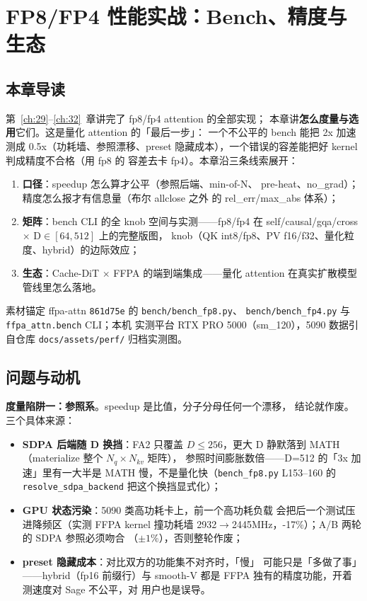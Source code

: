 \chapter{FP8/FP4 性能实战：Bench、精度与生态}\label{ch:33}

\section{本章导读}

第~\ref{ch:29}--\ref{ch:32}~章讲完了 fp8/fp4 attention 的全部实现；
本章讲\textbf{怎么度量与选用}它们。这是量化 attention 的「最后一步」：
一个不公平的 bench 能把 2x 加速测成 0.5x（功耗墙、参照漂移、preset
隐藏成本），一个错误的容差能把好 kernel 判成精度不合格（用 fp8 的
容差去卡 fp4）。本章沿三条线索展开：
\begin{enumerate}[itemsep=0pt,topsep=2pt]
  \item \textbf{口径}：speedup 怎么算才公平（参照后端、min-of-N、
        pre-heat、no\_grad）；精度怎么报才有信息量（布尔 allclose 之外
        的 rel\_err/max\_abs 体系）；
  \item \textbf{矩阵}：bench CLI 的全 knob 空间与实测——fp8/fp4 在
        self/causal/gqa/cross $\times$ D$\in[64,512]$ 上的完整版图，
        knob（QK int8/fp8、PV f16/f32、量化粒度、hybrid）的边际效应；
  \item \textbf{生态}：Cache-DiT $\times$ FFPA 的端到端集成——量化
        attention 在真实扩散模型管线里怎么落地。
\end{enumerate}
素材锚定 ffpa-attn \texttt{861d75e} 的 \texttt{bench/bench\_fp8.py}、
\texttt{bench/bench\_fp4.py} 与 \texttt{ffpa\_attn.bench} CLI；本机
实测平台 RTX PRO 5000（sm\_120），5090 数据引自仓库
\texttt{docs/assets/perf/} 归档实测图。

\section{问题与动机}

\textbf{度量陷阱一：参照系}。speedup 是比值，分子分母任何一个漂移，
结论就作废。三个具体来源：
\begin{itemize}[itemsep=0pt,topsep=2pt]
  \item \textbf{SDPA 后端随 D 换挡}：FA2 只覆盖 $D\le256$，更大 D
        静默落到 MATH（materialize 整个 $N_q\times N_{kv}$ 矩阵），
        参照时间膨胀数倍——D=512 的「3x 加速」里有一大半是 MATH
        慢，不是量化快（\texttt{bench\_fp8.py} L153--160 的
        \texttt{resolve\_sdpa\_backend} 把这个换挡显式化）；
  \item \textbf{GPU 状态污染}：5090 类高功耗卡上，前一个高功耗负载
        会把后一个测试压进降频区（实测 FFPA kernel 撞功耗墙
        2932$\to$2445MHz，-17\%）；A/B 两轮的 SDPA 参照必须吻合
        （$\pm1\%$），否则整轮作废；
  \item \textbf{preset 隐藏成本}：对比双方的功能集不对齐时，「慢」
        可能只是「多做了事」——hybrid（fp16 前缀行）与 smooth-V
        都是 FFPA 独有的精度功能，开着测速度对 Sage 不公平，对
        用户也是误导。
\end{itemize}

